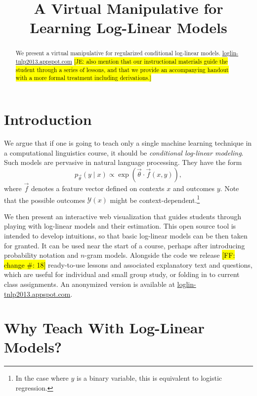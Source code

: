 \documentclass[11pt,letterpaper]{article}
\title{A Virtual Manipulative for Learning Log-Linear Models}
\author{
 }
\date{}
\newcommand{\Note}[1]{}
\renewcommand{\Note}[1]{\hl{[#1]}}
\newcommand{\NoteSigned}[3]{{\sethlcolor{#2}\Note{#1: #3}}}
\newcommand{\NoteFF}[1]{\NoteSigned{FF}{LightBlue}{#1}}
\newcommand{\NoteJE}[1]{\NoteSigned{JE}{LightGreen}{#1}}
\newcommand{\WhereToFind}[0]{\url{loglin-tnlp2013.appspot.com}}
\newcommand{\NumLessons}[0]{\NoteFF{change \#: 18}}
\begin{document}
\maketitle

\begin{abstract}
We present a virtual manipulative for regularized conditional log-linear models. \WhereToFind{}
\NoteJE{also mention that our instructional materials guide the student through a series of lessons, and that we provide an accompanying handout with a more formal treatment including derivations.}
\end{abstract}

\section{Introduction}\label{sec:intro}

We argue that if one is going to teach only a single machine learning
technique in a computational linguistics course, it should be {\em
  conditional log-linear modeling}.  Such models are pervasive in
natural language processing.  They have the form
\begin{equation}\label{eq:loglin}
p_{\vec{\theta}}(y \mid x) \propto \exp{\left(\vec{\theta} \cdot \vec{f}\left(x,y\right)\right)},
\end{equation}
where $\vec{f}$ denotes a feature vector defined on contexts $x$ and outcomes $y$. Note
that the possible outcomes $\mathcal{Y}(x)$ might be context-dependent.\footnote{In the case where $y$ is a
binary variable, this is equivalent to logistic regression.}


We then present an interactive web visualization that guides students
through playing with log-linear models and their estimation.  This
open source tool is intended to develop intuitions, so that basic log-linear
models can be then taken for granted.  It can be used near the start
of a course, perhaps after introducing probability notation and
$n$-gram models. Alongside the code we release \NumLessons{} 
ready-to-use lessons and associated explanatory text and questions, which
are useful for individual and small group study, or folding in to current class 
assignments. An anonymized version is available at \WhereToFind{}.

\section{Why Teach With Log-Linear Models?}
\end{document}
